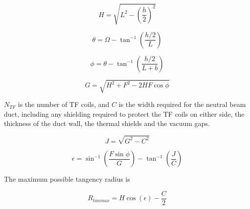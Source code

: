 \documentclass[hidelinks]{article}
\numberwithin{equation}{section}
\begin{document}
    \begin{equation}\label{eq: beam-a-h}
        H = \sqrt{ L^2 - (\frac{h}{2})^2 }
    \end{equation}

    \begin{equation}\label{eq: beam-a-theta}
        \theta = \Omega - \tan^{-1} \left ( \frac{h/2}{L} \right)
    \end{equation}

    \begin{equation}\label{eq: beam-a-phi}
        \phi = \theta - \tan^{-1} \left ( \frac{h/2}{L + b}  \right )
    \end{equation}

    \begin{equation}\label{eq: beam-a-g}
        G = \sqrt{H^2 + F^2 -2HF\cos \phi}
    \end{equation}

    \noi $N_{TF}$ is the number of TF coils, and $C$ is the width required for 
    the neutral beam duct, including any shielding required to protect the TF 
    coils on either side, the thickness of the duct wall, the thermal shields 
    and the vacuum gaps.

    \begin{equation}\label{eq: beam-a-j}
        J = \sqrt{G^2 - C^2}
    \end{equation}

    \begin{equation}\label{eq: beam-a-epsilon}
        \epsilon = \sin^{-1} \left ( \frac{F\sin \phi}{G} \right ) - 
        \tan^{-1} \left ( \frac{J}{C} \right )
    \end{equation}

    \noi The maximum possible tangency radius is

    \begin{equation}\label{eq: beam-a-rtan}
        R_{tanmax} = H \cos(\epsilon) - \frac{C}{2}
    \end{equation}

    {}
    
    
    
\end{document}
